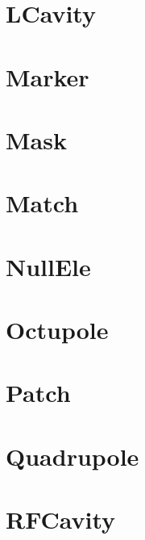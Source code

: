 \section{LCavity}
\label{s:lcavity}


\section{Marker}
\label{s:marker}


\section{Mask}
\label{s:mask}


\section{Match}
\label{s:match}


\section{NullEle}
\label{s:nullele}


\section{Octupole}
\label{s:octupole}


\section{Patch}
\label{s:patch}


\section{Quadrupole}
\label{s:quadrupole}


\section{RFCavity}
\label{s:rfcavity}


